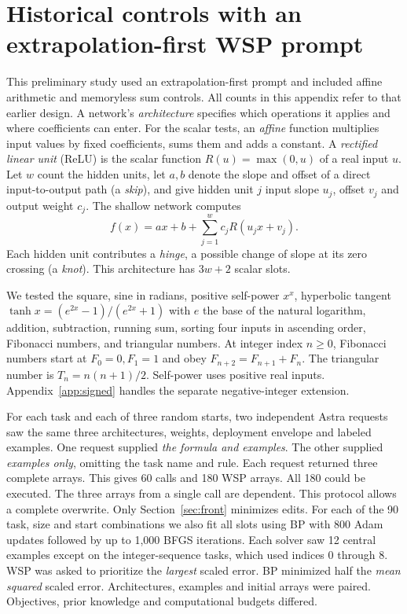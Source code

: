 \section{Historical controls with an extrapolation-first WSP prompt}\label{app:historical}
This preliminary study used an extrapolation-first prompt and included affine arithmetic and memoryless sum controls. All counts in this appendix refer to that earlier design. A network's \emph{architecture} specifies which operations it applies and where coefficients can enter. For the scalar tests, an \emph{affine} function multiplies input values by fixed coefficients, sums them and adds a constant. A \emph{rectified linear unit} (ReLU) is the scalar function $R(u)=\max(0,u)$ of a real input $u$. Let $w$ count the hidden units, let $a,b$ denote the slope and offset of a direct input-to-output path (a \emph{skip}), and give hidden unit $j$ input slope $u_j$, offset $v_j$ and output weight $c_j$. The shallow network computes
\[
                 f(x)=ax+b+\sum_{j=1}^{w}c_j R(u_jx+v_j).
\]
Each hidden unit contributes a \emph{hinge}, a possible change of slope at its zero crossing (a \emph{knot}). This architecture has $3w+2$ scalar slots.

We tested the square, sine in radians, positive self-power $x^x$, hyperbolic tangent $\tanh x=(e^{2x}-1)/(e^{2x}+1)$ with $e$ the base of the natural logarithm, addition, subtraction, running sum, sorting four inputs in ascending order, Fibonacci numbers, and triangular numbers. At integer index $n\ge0$, Fibonacci numbers start at $F_0=0,F_1=1$ and obey $F_{n+2}=F_{n+1}+F_n$. The triangular number is $T_n=n(n+1)/2$. Self-power uses positive real inputs. Appendix~\ref{app:signed} handles the separate negative-integer extension.

For each task and each of three random starts, two independent Astra requests saw the same three architectures, weights, deployment envelope and labeled examples. One request supplied \emph{the formula and examples}. The other supplied \emph{examples only}, omitting the task name and rule. Each request returned three complete arrays. This gives 60 calls and 180 WSP arrays. All 180 could be executed. The three arrays from a single call are dependent. This protocol allows a complete overwrite. Only Section~\ref{sec:front} minimizes edits. For each of the 90 task, size and start combinations we also fit all slots using BP with 800 Adam updates followed by up to 1,000 BFGS iterations. Each solver saw 12 central examples except on the integer-sequence tasks, which used indices 0 through 8. WSP was asked to prioritize the \emph{largest} scaled error. BP minimized half the \emph{mean squared} scaled error. Architectures, examples and initial arrays were paired. Objectives, prior knowledge and computational budgets differed.

